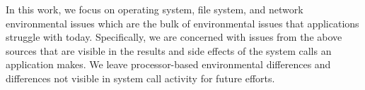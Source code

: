 In this work, we focus on operating system, file system, and network
environmental issues which are the bulk of environmental issues that
applications struggle with today. Specifically, we are concerned with issues
from the above sources that are visible in the results and side effects of the
system calls an application makes.  We leave processor-based environmental
differences and differences not visible in system call activity for future efforts.


